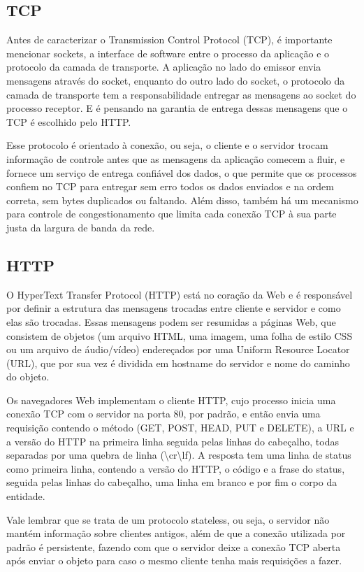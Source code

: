\documentclass[a4paper, 12pt]{article}
\begin{document}
\subsection{TCP}
Antes de caracterizar o Transmission Control Protocol (TCP), é importante mencionar sockets, a interface de software entre o processo da aplicação e o protocolo da camada de transporte. A aplicação no lado do emissor envia mensagens através do socket, enquanto do outro lado do socket, o protocolo da camada de transporte tem a responsabilidade entregar as mensagens ao socket do processo receptor. E é pensando na garantia de entrega dessas mensagens que o TCP é escolhido pelo HTTP.

Esse protocolo é orientado à conexão, ou seja, o cliente e o servidor trocam informação de controle antes que as mensagens da aplicação comecem a fluir, e fornece um serviço de entrega confiável dos dados, o que permite que os processos confiem no TCP para entregar sem erro todos os dados enviados e na ordem correta, sem bytes duplicados ou faltando. Além disso, também há um mecanismo para controle de congestionamento que limita cada conexão TCP à sua parte justa da largura de banda da rede.
\subsection{HTTP}
O HyperText Transfer Protocol (HTTP) está no coração da Web e é responsável por definir a estrutura das mensagens trocadas entre cliente e servidor e como elas são trocadas. Essas mensagens podem ser resumidas a páginas Web, que consistem de objetos (um arquivo HTML, uma imagem, uma folha de estilo CSS ou um arquivo de áudio/vídeo) endereçados por uma Uniform Resource Locator (URL), que por sua vez é dividida em hostname do servidor e nome do caminho do objeto.

Os navegadores Web implementam o cliente HTTP, cujo processo inicia uma conexão TCP com o servidor na porta 80, por padrão, e então envia uma requisição contendo o método (GET, POST, HEAD, PUT e DELETE), a URL e a versão do HTTP na primeira linha seguida pelas linhas do cabeçalho, todas separadas por uma quebra de linha (\textbackslash{}cr\textbackslash{}lf). A resposta tem uma linha de status como primeira linha, contendo a versão do HTTP, o código e a frase do status, seguida pelas linhas do cabeçalho, uma linha em branco e por fim o corpo da entidade.

Vale lembrar que se trata de um protocolo stateless, ou seja, o servidor não mantém informação sobre clientes antigos, além de que a conexão utilizada por padrão é persistente, fazendo com que o servidor deixe a conexão TCP aberta após enviar o objeto para caso o mesmo cliente tenha mais requisições a fazer.
\end{document}
